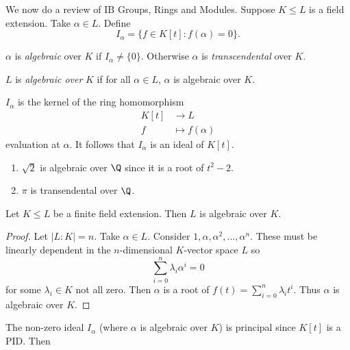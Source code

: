 \documentclass[a4paper]{article}
\begin{document}
We now do a review of IB Groups, Rings and Modules. Suppose \(K \leq L\) is a field extension. Take \(\alpha \in L\). Define
\[
  I_\alpha = \{f \in K[t]: f(\alpha) = 0\}.
\]

\begin{definition}
  \(\alpha\) is \emph{algebraic} over \(K\) if \(I_\alpha \neq \{0\}\). Otherwise \(\alpha\) is \emph{transcendental} over \(K\).
\end{definition}

\begin{definition}
  \(L\) is \emph{algebraic over} \(K\) if for all \(\alpha \in L\), \(\alpha\) is algebraic over \(K\).
\end{definition}

\begin{remark}
  \(I_\alpha\) is the kernel of the ring homomorphism
  \begin{align*}
    K[t] &\to L \\
    f &\mapsto f(\alpha)
  \end{align*}
  evaluation at \(\alpha\). It follows that \(I_\alpha\) is an ideal of \(K[t]\).
\end{remark}

\begin{eg}\leavevmode
  \begin{enumerate}
  \item \(\sqrt 2\) is algebraic over \(\Q\) since it is a root of \(t^2 - 2\).
  \item \(\pi\) is transendental over \(\Q\).
  \end{enumerate}
\end{eg}

\begin{lemma}
  Let \(K \leq L\) be a finite field extension. Then \(L\) is algebraic over \(K\).
\end{lemma}

\begin{proof}
  Let \(|L:K| = n\). Take \(\alpha \in L\). Consider \(1, \alpha, \alpha^2, \dots, \alpha^n\). These must be linearly dependent in the \(n\)-dimensional \(K\)-vector space \(L\) so
  \[
    \sum_{i = 0}^n \lambda_i\alpha^i = 0
  \]
  for some \(\lambda_i \in K\) not all zero. Then \(\alpha\) is a root of \(f(t) = \sum_{i = 0}^n \lambda_it^i\). Thus \(\alpha\) is algebraic over \(K.\)
\end{proof}

The non-zero ideal \(I_\alpha\) (where \(\alpha\) is algebraic over \(K\)) is principal since \(K[t]\) is a PID. Then
\end{document}
